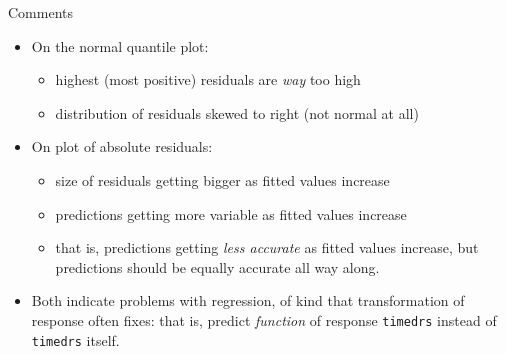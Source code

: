 \documentclass[unknownkeysallowed]{beamer}\usepackage[]{graphicx}\usepackage[]{color}
\begin{document}
\begin{frame}[fragile]{Comments}
  
  \begin{itemize}
  \item On the normal quantile plot:
    \begin{itemize}
    \item highest (most positive) residuals are \emph{way} too high
    \item distribution of residuals skewed to right (not normal at all)
    \end{itemize}
    
    
  \item On plot of absolute residuals:
    \begin{itemize}
    \item size of residuals getting bigger as fitted values increase
    \item predictions getting more variable as fitted values increase
    \item that is, predictions getting \emph{less accurate} as fitted
      values increase, but predictions should be equally accurate all
      way along.
    \end{itemize}
  \item Both indicate problems with regression, of kind that
    transformation of response often fixes: that is, predict
    \emph{function} of response \texttt{timedrs} instead of
    \texttt{timedrs} itself.
  \end{itemize}
  
\end{frame}
\end{document}
